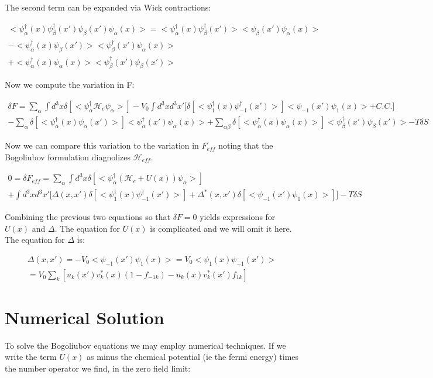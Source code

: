 \documentclass{article}
\begin{document}
The second term can be expanded via Wick contractions:

\begin{align*}
<\psi^\dagger_\alpha(x)\psi^\dagger_\beta(x')\psi_\beta(x')\psi_\alpha(x)>= <\psi^\dagger_\alpha(x)\psi^\dagger_\beta(x')><\psi_\beta(x')\psi_\alpha(x)> \\ 
-<\psi^\dagger_\alpha(x)\psi_\beta(x')><\psi^\dagger_\beta(x')\psi_\alpha(x)> \\
+<\psi^\dagger_\alpha(x)\psi_\alpha(x)><\psi^\dagger_\beta(x')\psi_\beta(x')>
\end{align*}

Now we compute the variation in F:

\begin{align*}
\delta F=\sum\limits_{\alpha}\int d^3x \delta[<\psi^\dagger_\alpha\mathcal{H}_e\psi_\alpha>]-V_0\int d^3x d^3x'\bigg[\delta[<\psi^\dagger_1(x)\psi^\dagger_{-1}(x')>]<\psi_{-1}(x')\psi_1(x)>+C.C.\bigg] \\
-\sum\limits_{\alpha}\delta[<\psi^\dagger_\alpha(x)\psi_\alpha(x')>]<\psi^\dagger_\alpha(x')\psi_\alpha(x)>
+\sum\limits_{\alpha\beta}\delta[<\psi^\dagger_\alpha(x)\psi_\alpha(x)>]<\psi^\dagger_\beta(x')\psi_\beta(x')>-T\delta S
\end{align*}

Now we can compare this variation to the variation in $F_{eff}$ noting that the Bogoliubov formulation diagnolizes $\mathcal{H}_{eff}$. 

\begin{align*}
0=\delta F_{eff}=\sum\limits_{\alpha}\int d^3x \delta[<\psi^\dagger_\alpha(\mathcal{H}_e+U(x))\psi_\alpha>] \\
+\int d^3x d^3x'\bigg[\Delta(x,x')\delta[<\psi^\dagger_1(x)\psi^\dagger_{-1}(x')>]+\Delta^*(x,x')\delta[<\psi_{-1}(x')\psi_1(x)>]\bigg]-T\delta S
\end{align*}

Combining the previous two equations so that $\delta F=0$ yields expressions for $U(x)$ and $\Delta$. The equation for $U(x)$ is complicated and we will omit it here. The equation for $\Delta$ is:

\begin{align*}
\Delta(x,x')=-V_0<\psi_{-1}(x')\psi_1(x)>=V_0<\psi_{1}(x)\psi_{-1}(x')> \\
=V_0\sum\limits_k[u_k(x')v^*_k(x)(1-f_{-1k})-u_k(x)v^*_k(x')f_{1k}]
\end{align*}

\section*{Numerical Solution}
To solve the Bogoliubov equations we may employ numerical techniques. If we write the term $U(x)$ as minus the chemical potential (ie the fermi energy) times the number operator we find, in the zero field limit:
\end{document}
